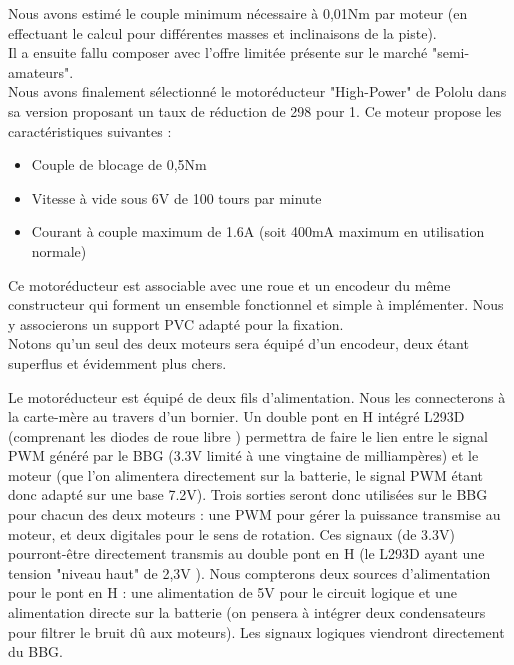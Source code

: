 			Nous avons estimé le couple minimum nécessaire à 0,01Nm par moteur (en effectuant le calcul pour différentes masses et inclinaisons de la piste).\\

			Il a ensuite fallu composer avec l'offre limitée présente sur le marché "semi-amateurs".\\

			Nous avons finalement sélectionné le motoréducteur "High-Power" de Pololu dans sa version proposant un taux de réduction de 298 pour 1.
			Ce moteur propose les caractéristiques suivantes :\cite{bib8} \\

			\begin{itemize}
				\item Couple de blocage de 0,5Nm
				\item Vitesse à vide sous 6V de 100 tours par minute
				\item Courant à couple maximum de 1.6A (soit 400mA maximum en utilisation normale)
			\end{itemize}


			Ce motoréducteur est associable avec une roue et un encodeur du même constructeur qui forment un ensemble fonctionnel et simple à implémenter. Nous y associerons un support PVC adapté pour la fixation.\\
			Notons qu'un seul des deux moteurs sera équipé d'un encodeur, deux étant superflus et évidemment plus chers.

			Le motoréducteur est équipé de deux fils d'alimentation. Nous les connecterons à la carte-mère au travers d'un bornier. Un double pont en H intégré L293D (comprenant les diodes de roue libre \cite{bib17}) permettra de faire le lien entre le signal PWM généré par le BBG (3.3V limité à une vingtaine de milliampères) et le moteur (que l'on alimentera directement sur la batterie, le signal PWM étant donc adapté sur une base 7.2V). Trois sorties seront donc utilisées sur le BBG pour chacun des deux moteurs : une PWM pour gérer la puissance transmise au moteur, et deux digitales pour le sens de rotation. Ces signaux (de 3.3V) pourront-être directement transmis au double pont en H (le L293D ayant une tension "niveau haut" de 2,3V \cite{bib17}). Nous compterons deux sources d'alimentation pour le pont en H : une alimentation de 5V pour le circuit logique et une alimentation directe sur la batterie (on pensera à intégrer deux condensateurs pour filtrer le bruit dû aux moteurs). Les signaux logiques viendront directement du BBG.\\

